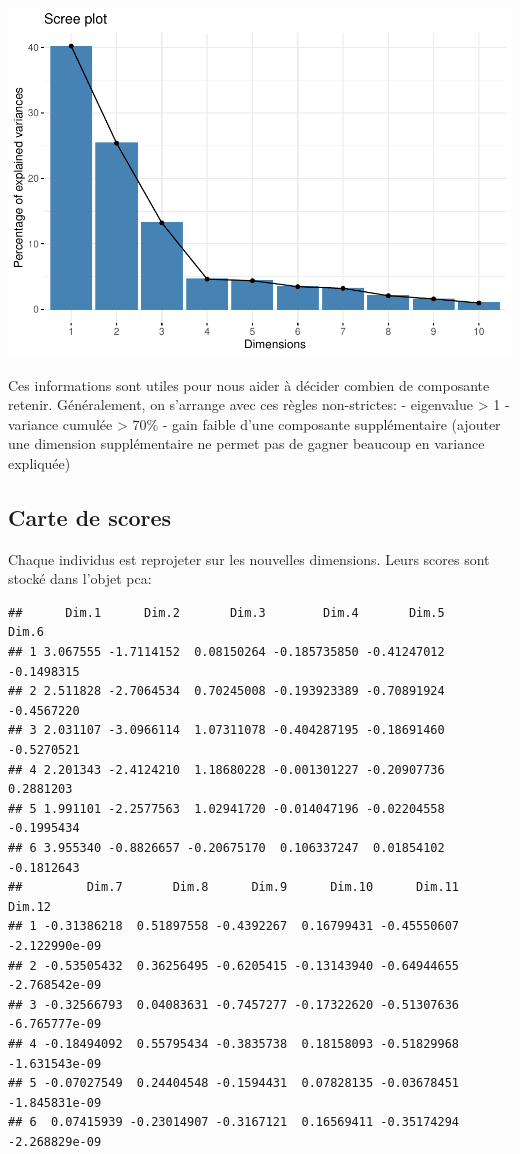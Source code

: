 \documentclass[
]{book}
\newenvironment{Shaded}{\begin{snugshade}}{\end{snugshade}}
\newcommand{\FunctionTok}[1]{\textcolor[rgb]{0.13,0.29,0.53}{\textbf{#1}}}
\newcommand{\NormalTok}[1]{#1}
\newcommand{\SpecialCharTok}[1]{\textcolor[rgb]{0.81,0.36,0.00}{\textbf{#1}}}
\begin{document}
\includegraphics{manuel_geo_quanti_files/figure-latex/unnamed-chunk-71-1.pdf}

Ces informations sont utiles pour nous aider à décider combien de composante retenir. Généralement, on s'arrange avec ces règles non-strictes: - eigenvalue \textgreater{} 1 - variance cumulée \textgreater{} 70\% - gain faible d'une composante supplémentaire (ajouter une dimension supplémentaire ne permet pas de gagner beaucoup en variance expliquée)

\hypertarget{carte-de-scores}{%
\subsection{Carte de scores}\label{carte-de-scores}}

Chaque individus est reprojeter sur les nouvelles dimensions. Leurs scores sont stocké dans l'objet pca:

\begin{Shaded}
\end{Shaded}

\begin{verbatim}
##      Dim.1      Dim.2       Dim.3        Dim.4       Dim.5      Dim.6
## 1 3.067555 -1.7114152  0.08150264 -0.185735850 -0.41247012 -0.1498315
## 2 2.511828 -2.7064534  0.70245008 -0.193923389 -0.70891924 -0.4567220
## 3 2.031107 -3.0966114  1.07311078 -0.404287195 -0.18691460 -0.5270521
## 4 2.201343 -2.4124210  1.18680228 -0.001301227 -0.20907736  0.2881203
## 5 1.991101 -2.2577563  1.02941720 -0.014047196 -0.02204558 -0.1995434
## 6 3.955340 -0.8826657 -0.20675170  0.106337247  0.01854102 -0.1812643
##         Dim.7       Dim.8      Dim.9      Dim.10      Dim.11        Dim.12
## 1 -0.31386218  0.51897558 -0.4392267  0.16799431 -0.45550607 -2.122990e-09
## 2 -0.53505432  0.36256495 -0.6205415 -0.13143940 -0.64944655 -2.768542e-09
## 3 -0.32566793  0.04083631 -0.7457277 -0.17322620 -0.51307636 -6.765777e-09
## 4 -0.18494092  0.55795434 -0.3835738  0.18158093 -0.51829968 -1.631543e-09
## 5 -0.07027549  0.24404548 -0.1594431  0.07828135 -0.03678451 -1.845831e-09
## 6  0.07415939 -0.23014907 -0.3167121  0.16569411 -0.35174294 -2.268829e-09
\end{verbatim}
\end{document}
